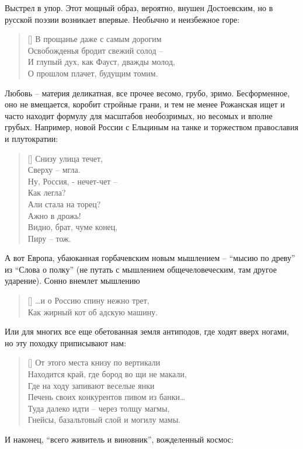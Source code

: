 \documentclass[12pt,a5paper,twoside]{article}
\begin{document}
Выстрел в упор. Этот мощный образ, вероятно, внушен 
Достоевским, но в русской поэзии возникает впервые. Необычно и неизбежное горе:

\settowidth{\versewidth}{В прощанье даже с самым дорогим}
\begin{verse}[\versewidth]
В прощанье даже с самым дорогим\\
Освобожденья бродит свежий солод --\\
И глупый дух, как Фауст, дважды молод,\\
О прошлом плачет, будущим томим.
\end{verse}

Любовь -- материя деликатная, все прочее весомо, грубо, зримо. 
Бесформенное, оно не вмещается, коробит стройные грани, и тем не менее Рожанская 
ищет и часто находит формулу для масштабов необозримых, но весомых и вполне грубых. 
Например, новой России с Ельциным на танке и торжеством православия и плутократии:

\settowidth{\versewidth}{Снизу улица течет,}
\begin{verse}[\versewidth]
Снизу улица течет,\\
Сверху -- мгла.\\
Ну, Россия, - нечет-чет --\\
Как легла?\\
Али стала на торец?\\
Ажно в дрожь!\\
Видно, брат, чуме конец,\\ 
Пиру -- тож.
\end{verse}

А вот Европа, убаюканная горбачевским новым мышлением -- ``мысию по древу'' 
из ``Слова о полку'' (не путать с мышлением общечеловеческим, там другое ударение). Сонно внемлет мышлению

\settowidth{\versewidth}{…и о Россию спину нежно трет,}
\begin{verse}[\versewidth]
…и о Россию спину нежно трет,\\
Как жирный кот об адскую машину.
\end{verse}

Или для многих все еще обетованная земля антиподов, где ходят вверх ногами, но эту походку приписывают нам:

\settowidth{\versewidth}{От этого места книзу по вертикали}
\begin{verse}[\versewidth]
От этого места книзу по вертикали\\
Находится край, где бород во щи не макали,\\
Где на ходу запивают веселые янки\\
Печень своих конкурентов пивом из банки…\\
Туда далеко идти -- через толщу магмы,\\
Гнейсы, базальтовый слой и могилу мамы.
\end{verse}
И наконец, ``всего живитель и виновник'', вожделенный космос:
\end{document}
